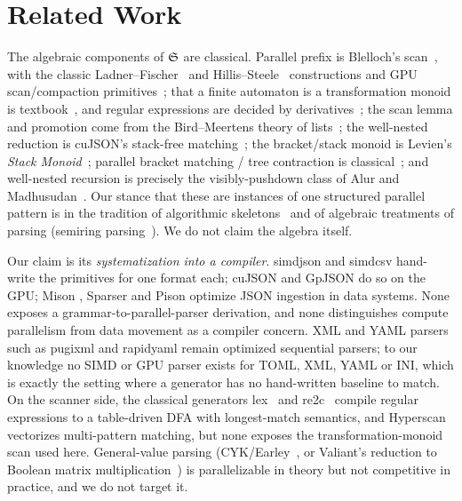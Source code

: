 \section{Related Work}
\label{sec:related}

The algebraic components of $\mathfrak{S}$ are classical.  Parallel prefix is
Blelloch's scan~\cite{blelloch}, with the classic
Ladner--Fischer~\cite{ladnerfischer} and Hillis--Steele~\cite{hillissteele}
constructions and GPU scan/compaction primitives~\cite{sengupta}; that a finite
automaton is a transformation monoid is
textbook~\cite{eilenberg,hopcroftullman}, and regular expressions are decided by
derivatives~\cite{brzozowski}; the scan lemma and promotion come from the
Bird--Meertens theory of lists~\cite{birdlists,birddemoor,meertens}; the
well-nested reduction is \textsf{cuJSON}'s stack-free
matching~\cite{cujson}; the bracket/stack monoid is Levien's \emph{Stack
Monoid}~\cite{stackmonoid}; parallel bracket matching / tree contraction is
classical~\cite{baronvishkin,millerreif}; and well-nested recursion is precisely
the visibly-pushdown class of Alur and Madhusudan~\cite{alur}.  Our stance that
these are instances of one structured parallel pattern is in the tradition of
algorithmic skeletons~\cite{cole} and of algebraic treatments of parsing
(semiring parsing~\cite{goodman}).  We do not claim the algebra itself.

Our claim is its \emph{systematization into a compiler}.  \textsf{simdjson}
\cite{simdjson} and \textsf{simdcsv} \cite{simdcsv} hand-write the primitives
for one format each; \textsf{cuJSON} \cite{cujson} and \textsf{GpJSON}
\cite{gpjson} do so on the GPU; \textsf{Mison} \cite{mison},
\textsf{Sparser} \cite{sparser} and \textsf{Pison} \cite{pison} optimize JSON
ingestion in data systems.  None exposes a grammar-to-parallel-parser
derivation, and none distinguishes compute parallelism from data movement as a
compiler concern.  XML and YAML parsers such as \textsf{pugixml}
\cite{pugixml} and \textsf{rapidyaml} remain optimized sequential parsers; to
our knowledge no SIMD or GPU parser exists for TOML, XML, YAML or INI, which is
exactly the setting where a generator has no hand-written baseline to match.
On the scanner side, the classical generators \textsf{lex}~\cite{lex} and
\textsf{re2c}~\cite{re2c} compile regular expressions to a table-driven DFA with
longest-match semantics, and \textsf{Hyperscan}~\cite{hyperscan} vectorizes
multi-pattern matching, but none exposes the transformation-monoid scan used
here.  General-value parsing (CYK/Earley~\cite{earley}, or Valiant's reduction to
Boolean matrix multiplication~\cite{valiant}) is parallelizable in theory but
not competitive in practice, and we do not target it.
